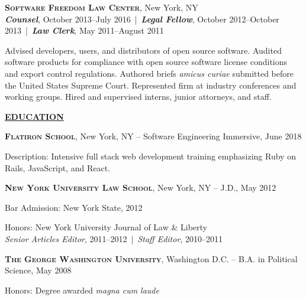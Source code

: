 \documentclass[11pt,letterpaper,english]{article}
\newenvironment{resumelist}[1]
{\begin{list}{}
{\setlength\itemsep{0pt}
\setlength\topsep{0pt}
\setlength\parskip{0pt}
\setlength\parsep{0pt}
\settowidth{\labelwidth}{#1}
 \setlength{\leftmargin}{\labelwidth}
 \addtolength{\leftmargin}{\labelsep}
 \renewcommand{\makelabel}[1]{##1\hfil}}}
{\end{list}}
\begin{document}
\textbf{\textsc{Software Freedom Law Center}}, New York, NY\\\nopagebreak
\textbf{\textit{Counsel}}, October 2013--July 2016\ |\ \textbf{\textit{Legal Fellow}}, October 2012--October 2013\ |\ \textbf{\textit{Law Clerk}}, May 2011--August 2011
\begin{resumelist}{M}
\item Advised developers, users, and distributors of open source software. Audited software products for compliance with open source software license conditions and export control regulations. Authored briefs \textit{amicus curiae} submitted before the United States Supreme Court. Represented firm at industry conferences and working groups. Hired and supervised interns, junior attorneys, and staff.
\end{resumelist}
\bigskip

\label{Education}
\underline{\textbf{\textsc{\large EDUCATION}}}{\large \par}
\smallskip

\textbf{\textsc{Flatiron School}}, New York, NY -- Software Engineering Immersive, June 2018
\begin{resumelist}{MMMMMMMM}
\item [{Description:}] Intensive full stack web development training emphasizing Ruby on Rails, JavaScript, and React.
\end{resumelist}
\smallskip

\textbf{\textsc{New York University Law School}}, New York, NY -- J.D., May 2012
\begin{resumelist}{MMMMMMMM}
\item [{Bar Admission:}] New York State, 2012
\item [{Honors:}] New York University Journal of Law \& Liberty\\
\textit{Senior Articles Editor}, 2011--2012~|~\textit{Staff Editor}, 2010--2011
\end{resumelist}
\smallskip

\textbf{\textsc{The George Washington University}}, Washington D.C. -- B.A. in Political Science, May 2008
\begin{resumelist}{MMMMMMMM}
\item [{Honors:}] Degree awarded \textit{magna cum laude}
\end{resumelist}
\end{document}
